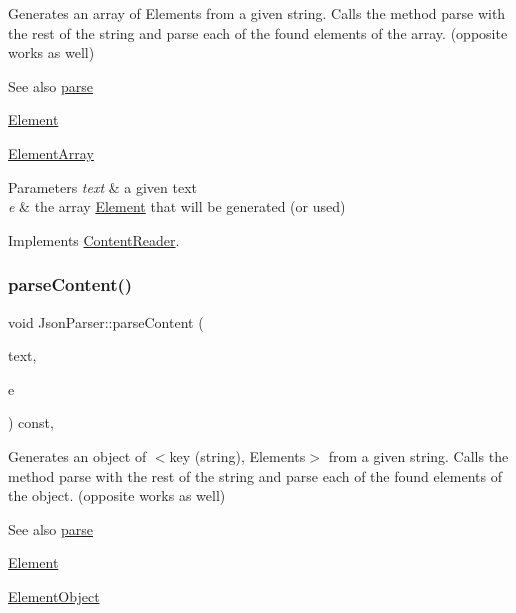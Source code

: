 Generates an array of Elements from a given string. Calls the method parse with the rest of the string and parse each of the found elements of the array. (opposite works as well) \begin{DoxySeeAlso}{See also}
\mbox{\hyperlink{classJsonParser_a3ec3a9fcc8a63f987b4749d60b0568df}{parse}} 

\mbox{\hyperlink{classElement}{Element}} 

\mbox{\hyperlink{classElementArray}{Element\+Array}}
\end{DoxySeeAlso}

\begin{DoxyParams}{Parameters}
{\em text} & a given text \\
\hline
{\em e} & the array \mbox{\hyperlink{classElement}{Element}} that will be generated (or used) \\
\hline
\end{DoxyParams}


Implements \mbox{\hyperlink{classContentReader_a91fdd738983dcc7a246c3c163007dfa9}{Content\+Reader}}.

\mbox{\label{classJsonParser_a7d4fad0f0947a74ca158dc1922c97355}} 
\subsubsection{\texorpdfstring{parse\+Content()}{parseContent()}\hspace{0.1cm}{\footnotesize\ttfamily [5/6]}}
{\footnotesize\ttfamily void Json\+Parser\+::parse\+Content (\begin{DoxyParamCaption}\item[{std\+::string \&}]{text,  }\item[{\mbox{\hyperlink{classElementObject}{Element\+Object}} $\ast$}]{e }\end{DoxyParamCaption}) const\hspace{0.3cm}{\ttfamily [override]}, {\ttfamily [virtual]}}

Generates an object of $<$key (string), Elements$>$ from a given string. Calls the method parse with the rest of the string and parse each of the found elements of the object. (opposite works as well) \begin{DoxySeeAlso}{See also}
\mbox{\hyperlink{classJsonParser_a3ec3a9fcc8a63f987b4749d60b0568df}{parse}} 

\mbox{\hyperlink{classElement}{Element}} 

\mbox{\hyperlink{classElementObject}{Element\+Object}}
\end{DoxySeeAlso}

